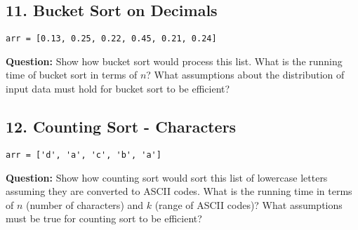 \documentclass[12pt]{article}
\begin{document}
\vspace{2em}

\subsection*{11. Bucket Sort on Decimals}
\begin{lstlisting}
arr = [0.13, 0.25, 0.22, 0.45, 0.21, 0.24]
\end{lstlisting}
\textbf{Question:} Show how bucket sort would process this list. What is the running time of bucket sort in terms of $n$? What assumptions about the distribution of input data must hold for bucket sort to be efficient?

\vspace{2em}

\subsection*{12. Counting Sort - Characters}
\begin{lstlisting}
arr = ['d', 'a', 'c', 'b', 'a']
\end{lstlisting}
\textbf{Question:} Show how counting sort would sort this list of lowercase letters assuming they are converted to ASCII codes. What is the running time in terms of $n$ (number of characters) and $k$ (range of ASCII codes)? What assumptions must be true for counting sort to be efficient?
\end{document}
